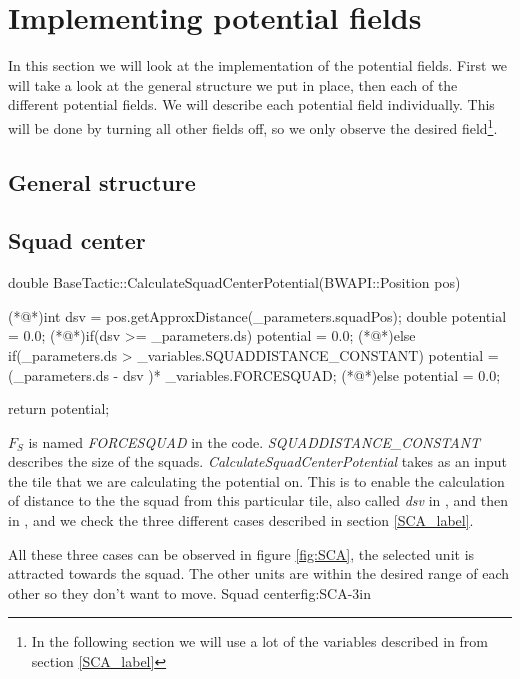{\color[rgb]{0.000000,0.000000,0.000000}\section{Implementing potential fields}
	In this section we will look at the implementation of the potential fields.
	First we will take a look at the general structure we put in place, then each of the different potential fields. We will describe each potential field individually. This will be done by turning all other fields off, so we only observe the desired field\footnote{In the following section we will use a lot of the variables described in from section \ref{SCA_label}}.
	
	\subsection{General structure}
	
	
	
	\subsection{Squad center}	
		\begin{Sourcecode}[caption=Squad center]
double BaseTactic::CalculateSquadCenterPotential(BWAPI::Position pos)
{
	(*@\lnote@*)int dsv = pos.getApproxDistance(_parameters.squadPos);	
	double potential = 0.0;
	(*@\lnote@*)if(dsv >= _parameters.ds)
		potential = 0.0;
	(*@\lnote@*)else if(_parameters.ds > _variables.SQUADDISTANCE_CONSTANT)
		potential = (_parameters.ds - dsv )* _variables.FORCESQUAD;
	(*@\lnote@*)else
		potential = 0.0;

	return potential;
}
\end{Sourcecode}
		$F_{S}$ is named \textit{FORCESQUAD} in the code.
		\textit{SQUADDISTANCE\_CONSTANT} describes the size of the squads. 
		\textit{CalculateSquadCenterPotential} takes as an input the tile that we are calculating the potential on. This is to enable the calculation of distance to the the squad from this particular tile, also called \textit{dsv} in , and then in , and  we check the three different cases described in section \ref{SCA_label}.		
		
		All these three cases can be observed in figure \ref{fig:SCA}, the selected unit is attracted towards the squad. The other units are within the desired range of each other so they don't want to move.
			{Squad center}{fig:SCA}{-3in}
				 
}
